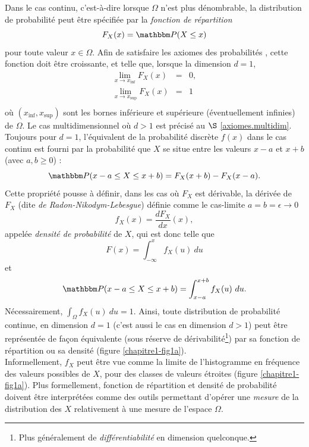 Dans le cas continu, c'est-\`a-dire lorsque $\Omega$ n'est plus d\'enombrable, la distribution de probabilit\'e peut \^etre sp\'ecifi\'ee par la {\it fonction de r\'epartition} 
$$
F_X(x) = \Pm(X\leq x)
$$
pour toute valeur $x\in\Omega$. Afin de satisfaire les axiomes des probabilit\'es \cite{kolmogorov1950}, cette fonction doit \^etre croissante, et telle que, lorsque la dimension $d=1$, 
\begin{eqnarray*}
\lim\limits_{x \to x_{\inf}} F_X(x) & = & 0, \\
\lim\limits_{x \to x_{\sup}} F_X(x) & = & 1 \\
\end{eqnarray*}
o\`u $(x_{\inf},x_{\sup})$ sont les bornes inf\'erieure et sup\'erieure (\'eventuellement infinies) de $\Omega$. Le cas multidimensionnel o\`u $d>1$ est pr\'ecis\'e au $\S$ \ref{axiomes.multidim}. Toujours pour $d=1$, l'\'equivalent de la probabilit\'e  discr\`ete $f(x)$ dans le cas continu est fourni par la probabilit\'e que $X$ se situe entre les valeurs $x-a$ et $x+b$ (avec $a,b\geq 0$) :
$$
\Pm(x-a \leq X \leq x+b) = F_X(x+b) - F_X(x-a).
$$
Cette propri\'et\'e pousse \`a d\'efinir, dans les cas o\`u $F_X$ est d\'erivable, la d\'eriv\'ee de $F_X$ (dite {\it de Radon-Nikodym-Lebesgue}) d\'efinie comme le cas-limite $a=b=\epsilon\to 0$  
$$
f_X(x) = \frac{d F_X}{d x}(x),
$$
appel\'ee {\it densit\'e de probabilit\'e} de $X$,  qui est donc telle que
$$
F(x) = \int_{-\infty}^x f_X(u) \ du
$$      
et
$$
\Pm(x-a \leq X \leq x+b) = \int_{x-a}^{x+b} f_X(u) \ du. 
$$
N\'ecessairement, $\int_{\Omega} f_X(u) \ du =1$. 
Ainsi, toute distribution de probabilit\'e continue, en dimension $d=1$ (c'est aussi le cas en dimension $d>1$) peut \^etre repr\'esent\'ee de fa\c con \'equivalente (sous r\'eserve de d\'erivabilit\'e\footnote{Plus g\'en\'eralement de {\it diff\'erentiabilit\'e} en dimension quelconque.}) par sa fonction de r\'epartition ou sa densit\'e (figure \ref{chapitre1-fig1a}). \\

Informellement, $f_X$ peut \^etre vue comme la limite de l'histogramme en fr\'equence des valeurs possibles de $X$, pour des classes de valeurs \'etroites (figure \ref{chapitre1-fig1a}). Plus formellement, fonction de r\'epartition et densit\'e de probabilit\'e doivent \^etre interpr\'et\'ees comme des outils permettant d'op\'erer une {\it mesure}  de la distribution des $X$ relativement \`a une mesure de l'espace $\Omega$. \\



